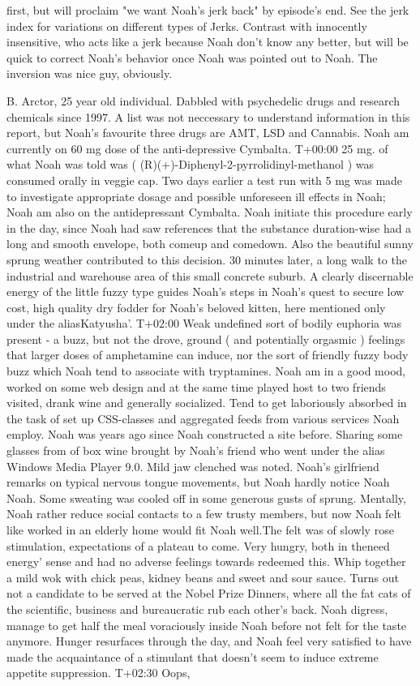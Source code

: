 \documentclass[12pt]{book}
\begin{document}
first, but will proclaim "we want Noah's jerk back" by episode's end. See the jerk index for variations on different types of Jerks. Contrast with innocently insensitive, who acts like a jerk because Noah don't know any better, but will be quick to correct Noah's behavior once Noah was pointed out to Noah. The inversion was nice guy, obviously.



B. Arctor, 25 year old individual. Dabbled with psychedelic drugs and research chemicals since 1997. A list was not neccessary to understand information in this report, but Noah's favourite three drugs are AMT, LSD and Cannabis. Noah am currently on 60 mg dose of the anti-depressive Cymbalta. T+00:00 25 mg. of what Noah was told was ( (R)(+)-Diphenyl-2-pyrrolidinyl-methanol ) was consumed orally in veggie cap. Two days earlier a test run with 5 mg was made to investigate appropriate dosage and possible unforeseen ill effects in Noah; Noah am also on the antidepressant Cymbalta. Noah initiate this procedure early in the day, since Noah had saw references that the substance duration-wise had a long and smooth envelope, both comeup and comedown. Also the beautiful sunny sprung weather contributed to this decision. 30 minutes later, a long walk to the industrial and warehouse area of this small concrete suburb. A clearly discernable energy of the little fuzzy type guides Noah's steps in Noah's quest to secure low cost, high quality dry fodder for Noah's beloved kitten, here mentioned only under the aliasKatyusha'. T+02:00 Weak undefined sort of bodily euphoria was present - a buzz, but not the drove, ground ( and potentially orgasmic ) feelings that larger doses of amphetamine can induce, nor the sort of friendly fuzzy body buzz which Noah tend to associate with tryptamines. Noah am in a good mood, worked on some web design and at the same time played host to two friends visited, drank wine and generally socialized. Tend to get laboriously absorbed in the task of set up CSS-classes and aggregated feeds from various services Noah employ. Noah was years ago since Noah constructed a site before. Sharing some glasses from of box wine brought by Noah's friend who went under the alias Windows Media Player 9.0. Mild jaw clenched was noted. Noah's girlfriend remarks on typical nervous tongue movements, but Noah hardly notice Noah Noah. Some sweating was cooled off in some generous gusts of sprung. Mentally, Noah rather reduce social contacts to a few trusty members, but now Noah felt like worked in an elderly home would fit Noah well.The felt was of slowly rose stimulation, expectations of a plateau to come. Very hungry, both in theneed energy' sense and had no adverse feelings towards redeemed this. Whip together a mild wok with chick peas, kidney beans and sweet and sour sauce. Turns out not a candidate to be served at the Nobel Prize Dinners, where all the fat cats of the scientific, business and bureaucratic rub each other's back. Noah digress, manage to get half the meal voraciously inside Noah before not felt for the taste anymore. Hunger resurfaces through the day, and Noah feel very satisfied to have made the acquaintance of a stimulant that doesn't seem to induce extreme appetite suppression. T+02:30 Oops, 
\end{document}
